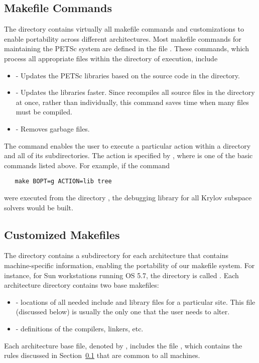 \subsection{Makefile Commands} \label{sec:common}

The directory  contains virtually all
makefile commands and customizations to enable portability across
different architectures.  Most makefile commands for maintaining the
PETSc system are defined in the file .  
These commands, which process all appropriate files within the
directory of execution, include
\begin{itemize}
\item {} - Updates the PETSc libraries based on the source code
      in the directory.
\item {} - Updates the libraries faster.  Since
       recompiles all source files in the directory at once,
      rather than individually, this command saves time when many files
      must be compiled.
\item {} - Removes garbage files.
\end{itemize}

The  command enables the user to execute a particular action
within a directory and all of its subdirectories.  The action is specified
by , where  is one of the basic commands
listed above. For example, if the command
\begin{verbatim}
   make BOPT=g ACTION=lib tree
\end{verbatim}
were executed from the directory ,
the debugging library for all Krylov subspace solvers would be built.

\subsection{Customized Makefiles}
\label{sec:custom}

The directory  contains a subdirectory for each 
architecture that contains machine-specific information, enabling the
portability of our makefile system.
For instance, for Sun workstations running OS 5.7, the 
directory is called .  Each architecture directory contains
two base makefiles:
\begin{itemize}
\item {} - locations of all needed include
      and library files for a particular site. This file (discussed
      below) is usually the only one that the user needs to alter.
\item {} - definitions of the compilers, linkers, etc.
\end{itemize}
Each architecture base file, denoted by
,
includes the file \break {},
which contains the rules discussed in Section~\ref{sec:common}
that are common to all machines.

